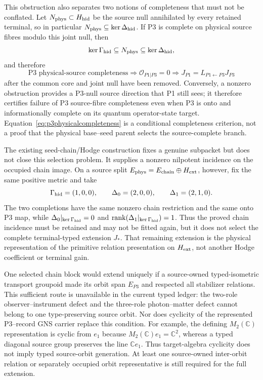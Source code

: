 This obstruction also separates two notions of completeness that must not be
conflated.  Let $N_{\rm phys}\subset H_{\rm hid}$ be the source null
annihilated by every retained terminal, so in particular
$N_{\rm phys}\subseteq\ker\Delta_{\rm hid}$.  If P3 is complete on physical
source fibres modulo this joint null, then
\begin{equation}
\ker\Gamma_{\rm hid}\subseteq N_{\rm phys}
\subseteq\ker\Delta_{\rm hid},
\end{equation}
and therefore
\begin{equation}
\boxed{
\text{P3 physical-source completeness}
\Longrightarrow \mathcal O_{P1|P3}=0
\Longrightarrow J_{P1}=L_{P1\leftarrow P3}J_{P3}}
\label{eq:p3physicalcompleteness}
\end{equation}
after the common core and joint null have been removed.  Conversely, a
nonzero obstruction provides a P3-null source direction that P1 still sees;
it therefore certifies failure of P3 source-fibre completeness even when P3
is onto and informationally complete on its quantum operator-state target.
Equation~\eqref{eq:p3physicalcompleteness} is a conditional completeness
criterion, not a proof that the physical base--seed parent selects the
source-complete branch.

The existing seed-chain/Hodge construction fixes a genuine subpacket but does
not close this selection problem.  It supplies a nonzero nilpotent incidence
on the occupied chain image.  On a source split
$E_{\rm phys}=E_{\rm chain}\oplus H_{\rm ext}$, however, fix the same positive
metric and take
\begin{equation}
\Gamma_{\rm hid}=(1,0,0),\qquad
\Delta_0=(2,0,0),\qquad
\Delta_1=(2,1,0).
\label{eq:seedchainextensions}
\end{equation}
The two completions have the same nonzero chain restriction and the same onto
P3 map, while
$\Delta_0|_{\ker\Gamma_{\rm hid}}=0$ and
$\operatorname{rank}(\Delta_1|_{\ker\Gamma_{\rm hid}})=1$.  Thus the proved
chain incidence must be retained and may not be fitted again, but it does not
select the complete terminal-typed extension $J_*$.  That remaining extension
is the physical representation of the primitive relation presentation on
$H_{\rm ext}$, not another Hodge coefficient or terminal gain.

One selected chain block would extend uniquely if a source-owned
typed-isometric transport groupoid made its orbit span $E_{P3}$ and respected
all stabilizer relations.  This sufficient route is unavailable in the
current typed ledger: the two-role observer--instrument defect and the
three-role photon--matter defect cannot belong to one type-preserving source
orbit.  Nor does cyclicity of the represented P3--record GNS carrier replace
this condition.  For example, the defining $M_2(\mathbb C)$ representation
is cyclic from $e_1$ because $M_2(\mathbb C)e_1=\mathbb C^2$, whereas a typed
diagonal source group preserves the line $\mathbb C e_1$.  Thus target-algebra
cyclicity does not imply typed source-orbit generation.  At least one
source-owned inter-orbit relation or separately occupied orbit representative
is still required for the full extension.

